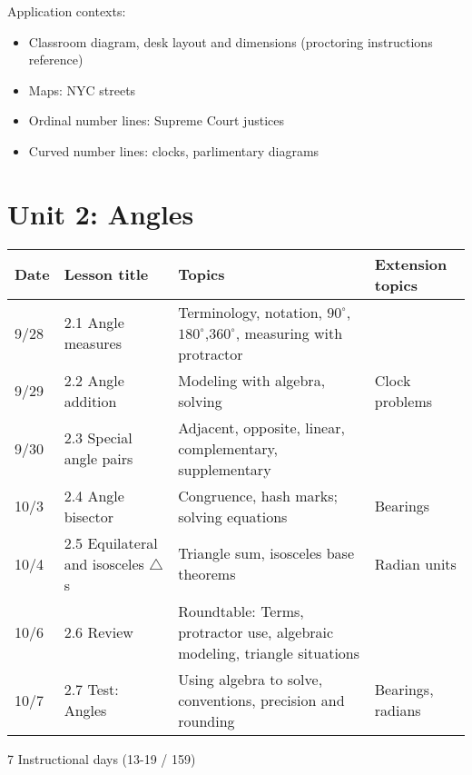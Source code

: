 Application contexts: 
\begin{itemize}
  \item Classroom diagram, desk layout and dimensions (proctoring instructions reference)
  \item Maps: NYC streets
  \item Ordinal number lines: Supreme Court justices
  \item Curved number lines: clocks, parlimentary diagrams
\end{itemize}


\newpage
\section*{Unit 2: Angles}
\begin{tabular}{|p{0.9cm}|p{4cm}|p{7cm}|p{5cm}|}
  \hline
  Date & Lesson title & Topics  & Extension topics \\
  \hline
  9/28 & 2.1 Angle measures & Terminology, notation, $90^\circ$, $180^\circ$,$360^\circ$, measuring with protractor &  \\
  \hline
  9/29 & 2.2 Angle addition & Modeling with algebra, solving & Clock problems \\
  \hline
  9/30 & 2.3 Special angle pairs & Adjacent, opposite, linear, complementary, supplementary &  \\
  \hline
  10/3 & 2.4 Angle bisector & Congruence, hash marks; solving equations & Bearings \\
  \hline
  10/4 & 2.5 Equilateral and isosceles $\triangle$s & Triangle sum, isosceles base theorems & Radian units \\
  \hline
  10/6 & 2.6 Review & Roundtable: Terms, protractor use, algebraic modeling, triangle situations & \\
  \hline
  10/7 & 2.7 Test: Angles & Using algebra to solve, conventions, precision and rounding & Bearings, radians \\
  \hline

\end{tabular} \par \vspace*{0.3cm}
7 Instructional days (13-19 / 159)

